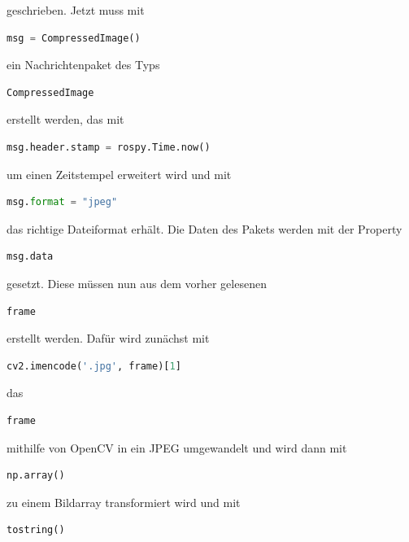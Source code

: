 geschrieben. Jetzt muss mit 

\begin{lstlisting}[language=Python]
msg = CompressedImage()
\end{lstlisting}

ein Nachrichtenpaket des Typs 

\begin{lstlisting}[language=Python]
CompressedImage
\end{lstlisting}

erstellt werden, das mit 

\begin{lstlisting}[language=Python]
msg.header.stamp = rospy.Time.now()
\end{lstlisting}

um einen Zeitstempel erweitert wird und mit 

\begin{lstlisting}[language=Python]
msg.format = "jpeg"
\end{lstlisting}

das richtige Dateiformat erhält. Die Daten des Pakets werden mit der Property 

\begin{lstlisting}[language=Python]
msg.data
\end{lstlisting}

gesetzt. Diese müssen nun aus dem vorher gelesenen 

\begin{lstlisting}[language=Python]
frame
\end{lstlisting}

erstellt werden. Dafür wird zunächst mit 

\begin{lstlisting}[language=Python]
cv2.imencode('.jpg', frame)[1]
\end{lstlisting}

das 

\begin{lstlisting}[language=Python]
frame
\end{lstlisting}

mithilfe von OpenCV in ein JPEG umgewandelt und wird dann mit 

\begin{lstlisting}[language=Python]
np.array()
\end{lstlisting}

zu einem Bildarray transformiert wird und mit

\begin{lstlisting}[language=Python]
tostring()
\end{lstlisting}

